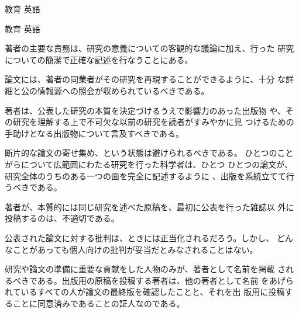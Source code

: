 \documentclass[fleqn]{jbook}
\begin{document}
\begin{question}{教育 英語}{}
\begin{subquestions}
\end{subquestions}
\end{question}
\begin{answer}{教育 英語}{}

\begin{subanswers}
\SubAnswer

  \begin{subsubanswers}
  \SubSubAnswer
    著者の主要な責務は、研究の意義についての客観的な議論に加え、行った
    研究についての簡潔で正確な記述を行なうことにある。

  \SubSubAnswer
   論文には、著者の同業者がその研究を再現することができるように、十分
   な詳細と公の情報源への照会が収められているべきである。

  \SubSubAnswer
    著者は、公表した研究の本質を決定づけるうえで影響力のあった出版物
    や、その研究を理解する上で不可欠な以前の研究を読者がすみやかに見
    つけるための手助けとなる出版物について言及すべきである。

  \SubSubAnswer
    断片的な論文の寄せ集め、という状態は避けられるべきである。
    ひとつのことがらについて広範囲にわたる研究を行った科学者は、ひとつ
    ひとつの論文が、研究全体のうちのある一つの面を完全に記述するように
    、出版を系統立てて行うべきである。

  \SubSubAnswer
    著者が、本質的には同じ研究を述べた原稿を、最初に公表を行った雑誌以
    外に投稿するのは、不適切である。

  \SubSubAnswer
    公表された論文に対する批判は、ときには正当化されるだろう。しかし、
    どんなことがあっても個人向けの批判が妥当だとみなされることはない。

  \SubSubAnswer
    研究や論文の準備に重要な貢献をした人物のみが、著者として名前を掲載
    されるべきである。出版用の原稿を投稿する著者は、他の著者として名前
    をあげられているすべての人が論文の最終版を確認したことと、それを出
    版用に投稿することに同意済みであることの証人なのである。
  \end{subsubanswers}


\end{subanswers}
\end{answer}
\end{document}
